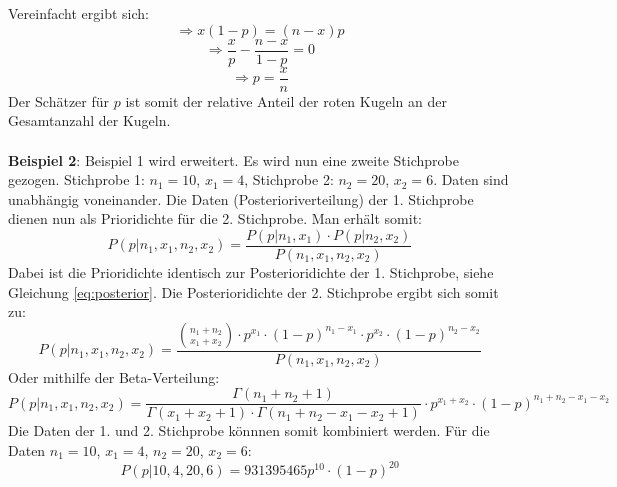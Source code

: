 \documentclass[a4paper,12pt]{article}
\begin{document}
Vereinfacht ergibt sich:
\begin{equation}
\Rightarrow x(1-p) = (n-x)p
\end{equation}
\begin{equation}  
\Rightarrow \frac{x}{p} - \frac{n-x}{1-p} = 0
\end{equation}
\begin{equation}
\Rightarrow p = \frac{x}{n}
\end{equation}
Der Schätzer für $p$ ist somit der relative Anteil der roten Kugeln an der Gesamtanzahl der Kugeln. \\\\
\textbf{Beispiel 2}: Beispiel 1 wird erweitert. Es wird nun eine zweite Stichprobe gezogen. 
Stichprobe 1: $n_1 = 10$, $x_1 = 4$, Stichprobe 2: $n_2 = 20$, $x_2 = 6$.
Daten sind unabhängig voneinander. Die Daten (Posterioriverteilung) der 1. Stichprobe dienen nun
als Prioridichte für die 2. Stichprobe. Man erhält somit:
\begin{equation}
P(p|n_1,x_1,n_2,x_2) = \frac{P(p|n_1,x_1) \cdot P(p|n_2,x_2)}{P(n_1,x_1,n_2,x_2)}
\end{equation}
Dabei ist die Prioridichte identisch zur Posterioridichte der 1. Stichprobe, siehe Gleichung \eqref{eq:posterior}.
Die Posterioridichte der 2. Stichprobe ergibt sich somit zu:
\begin{equation}
P(p|n_1,x_1,n_2,x_2) = \frac{\binom{n_1+n_2}{x_1+x_2} \cdot p^{x_1} \cdot (1-p)^{n_1-x_1} \cdot p^{x_2} \cdot (1-p)^{n_2-x_2}}{P(n_1,x_1,n_2,x_2)}
\end{equation}
Oder mithilfe der Beta-Verteilung:
\begin{equation}
  P(p|n_1,x_1,n_2,x_2) = \frac{\Gamma(n_1+n_2+1)}{\Gamma(x_1+x_2+1)\cdot\Gamma(n_1+n_2-x_1-x_2+1)} \cdot p^{x_1+x_2} \cdot (1-p)^{n_1+n_2-x_1-x_2}
\end{equation}
Die Daten der 1. und 2. Stichprobe könnnen somit kombiniert werden.
Für die Daten $n_1 = 10$, $x_1 = 4$, $n_2 = 20$, $x_2 = 6$:
\begin{equation}
P(p|10,4,20,6) = 931 395 465p^{10} \cdot (1-p)^{20}
\end{equation}
\end{document}
